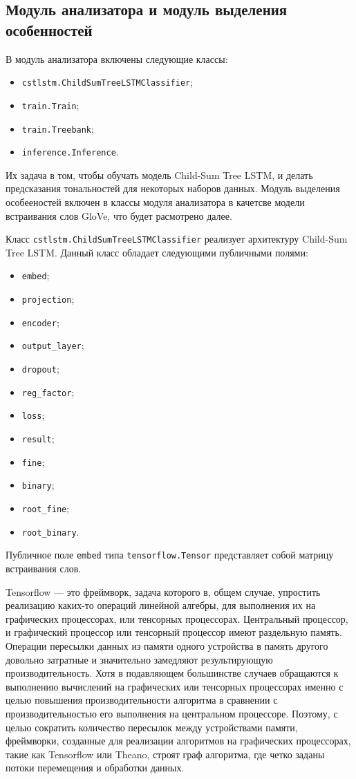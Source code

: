 \subsection{Модуль анализатора и модуль выделения особенностей}
В модуль анализатора включены следующие классы:
\begin{itemize}
\item \texttt{cstlstm.ChildSumTreeLSTMClassifier};
\item \texttt{train.Train};
\item \texttt{train.Treebank};
\item \texttt{inference.Inference}.
\end{itemize}
Их задача в том, чтобы обучать модель Child-Sum Tree LSTM, и делать предсказания тональностей для некоторых наборов данных. Модуль выделения особееностей включен в классы модуля анализатора в качетсве модели встраивания слов GloVe, что будет расмотрено далее.

Класс \texttt{cstlstm.ChildSumTreeLSTMClassifier} реализует архитектуру Child-Sum Tree LSTM\@. Данный класс обладает следующими публичными полями:
\begin{itemize}
\item \texttt{embed};
\item \texttt{projection};
\item \texttt{encoder};
\item \texttt{output\_layer};
\item \texttt{dropout};
\item \texttt{reg\_factor};
\item \texttt{loss};
\item \texttt{result};
\item \texttt{fine};
\item \texttt{binary};
\item \texttt{root\_fine};
\item \texttt{root\_binary}.
\end{itemize}

Публичное поле \texttt{embed} типа \texttt{tensorflow.Tensor} представляет собой матрицу встраивания слов.

Tensorflow --- это фреймворк, задача которого в, общем случае, упростить реализацию каких-то операций линейной алгебры, для выполнения их на графических процессорах, или тенсорных процессорах. Центральный процессор, и графический процессор или тенсорный процессор имеют раздельную память. Операции пересылки данных из памяти одного устройства в память другого довольно затратные и значительно замедляют результирующую производительность. Хотя в подавляющем большинстве случаев обращаются к выполнению вычислений на графических или тенсорных процессорах именно с целью повышения производительности алгоритма в сравнении с производительностью его выполнения на центральном процессоре. Поэтому, с целью сократить количество пересылок между устройствами памяти, фреймворки, созданные для реализации алгоритмов на графических процессорах, такие как Tensorflow или Theano, строят граф алгоритма, где четко заданы потоки перемещения и обработки данных.

